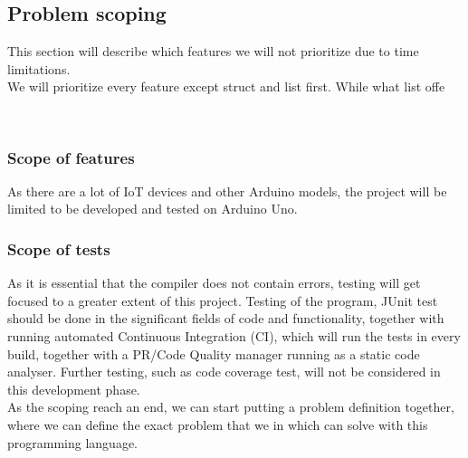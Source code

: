 \subsection{Problem scoping}
This section will describe which features we will not prioritize due to time limitations.\\
We will prioritize every feature except struct and list first. While what list offe 

\\
\subsubsection{Scope of features}
As there are a lot of IoT devices and other Arduino models, the project will be limited to be developed and tested on Arduino Uno.

\subsubsection{Scope of tests}
As it is essential that the compiler does not contain errors, testing will get focused to a greater extent of this project. Testing of the program, JUnit test should be done in the significant fields of code and functionality, together with running automated Continuous Integration (CI), which will run the tests in every build, together with a PR/Code Quality manager running as a static code analyser. Further testing, such as code coverage test, will not be considered in this development phase. \\


As the scoping reach an end, we can start putting a problem definition together, where we can define the exact problem that we in which can solve with this programming language.